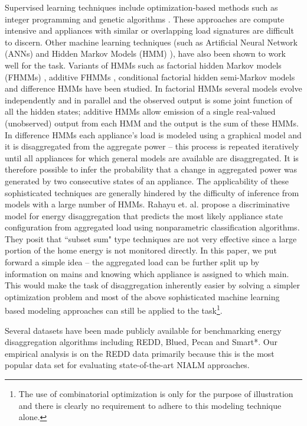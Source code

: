 \documentclass[conference]{IEEEtran}
\begin{document}
\noindent Supervised learning techniques include optimization-based methods such as integer programming \cite{Suzuki_08} and genetic algorithms \cite{Baranski_04}. These approaches are compute intensive and appliances with similar or overlapping load signatures are difficult to discern. Other machine learning techniques (such as Artificial Neural Network (ANNs) \cite{Ruzzelli_10} and Hidden Markov Models (HMM) \cite{Zia_11}), have also been shown to work well for the task. Variants of HMMs such as factorial hidden Markov models (FHMMs) \cite{Ghahramani_97a}, additive FHMMs \cite{Kolter_12}, conditional factorial hidden semi-Markov models \cite{Kim_11} and difference HMMs \cite{parson2012_aaai} have been studied. In factorial HMMs several models evolve independently and in parallel and the observed output is some joint function of all the hidden states; additive HMMs allow emission of a single real-valued (unobserved) output from each HMM and the output is the sum of these HMMs. In difference HMMs \cite{parson2012_aaai} each appliance's load is modeled using a graphical model and it is disaggregated from the aggregate power -- this process is repeated iteratively until all appliances for which general models are available are disaggregated. It is therefore possible to infer the probability that a change in aggregated power was generated by two consecutive states of an appliance. The applicability of these sophisticated techniques are generally hindered by the difficulty of inference from models with a large number of HMMs. Rahayu et. al. \cite{Rahayu_12} propose a discriminative model for energy disaggregation that predicts the most likely appliance state configuration from aggregated load using nonparametric classification algorithms. They posit that ``subset sum" type techniques are not very effective since a large portion of the home energy is not monitored directly. In this paper, we put forward a simple idea -- the aggregated load can be further split up by information on mains and knowing which appliance is assigned to which main. This would make the task of disaggregation inherently easier by solving a simpler optimization problem and most of the above sophisticated machine learning based modeling approaches can still be applied to the task\footnote{The use of combinatorial optimization is only for the purpose of illustration and there is clearly no requirement to adhere to this modeling technique alone.}. 

\noindent Several datasets have been made publicly available for benchmarking energy disaggregation algorithms including REDD\cite{redd}, Blued\cite{blued_cmu}, Pecan\cite{pecan} and Smart*\cite{smart}. Our empirical analysis is on the REDD data primarily because this is the most popular data set for evaluating state-of-the-art NIALM approaches. 
\end{document}
